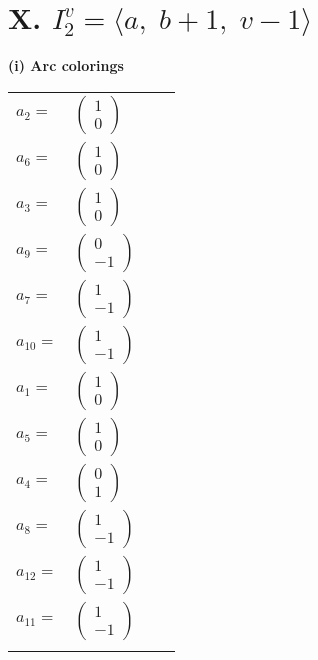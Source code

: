 \documentclass[1p]{elsarticle_modified}
\theoremstyle{definition}
\begin{document}
\centering \section*{X. $I^v_{2}= \langle a,\;b+1,\;v-1 \rangle$}
\flushleft \textbf{(i) Arc colorings}\\
\begin{tabular}{m{7pt} m{180pt} m{7pt} m{180pt} }
\flushright $a_{2}=$&$\begin{pmatrix}1\\0\end{pmatrix}$ \\
\flushright $a_{6}=$&$\begin{pmatrix}1\\0\end{pmatrix}$ \\
\flushright $a_{3}=$&$\begin{pmatrix}1\\0\end{pmatrix}$ \\
\flushright $a_{9}=$&$\begin{pmatrix}0\\-1\end{pmatrix}$ \\
\flushright $a_{7}=$&$\begin{pmatrix}1\\-1\end{pmatrix}$ \\
\flushright $a_{10}=$&$\begin{pmatrix}1\\-1\end{pmatrix}$ \\
\flushright $a_{1}=$&$\begin{pmatrix}1\\0\end{pmatrix}$ \\
\flushright $a_{5}=$&$\begin{pmatrix}1\\0\end{pmatrix}$ \\
\flushright $a_{4}=$&$\begin{pmatrix}0\\1\end{pmatrix}$ \\
\flushright $a_{8}=$&$\begin{pmatrix}1\\-1\end{pmatrix}$ \\
\flushright $a_{12}=$&$\begin{pmatrix}1\\-1\end{pmatrix}$ \\
\flushright $a_{11}=$&$\begin{pmatrix}1\\-1\end{pmatrix}$\\&\end{tabular}
\end{document}
